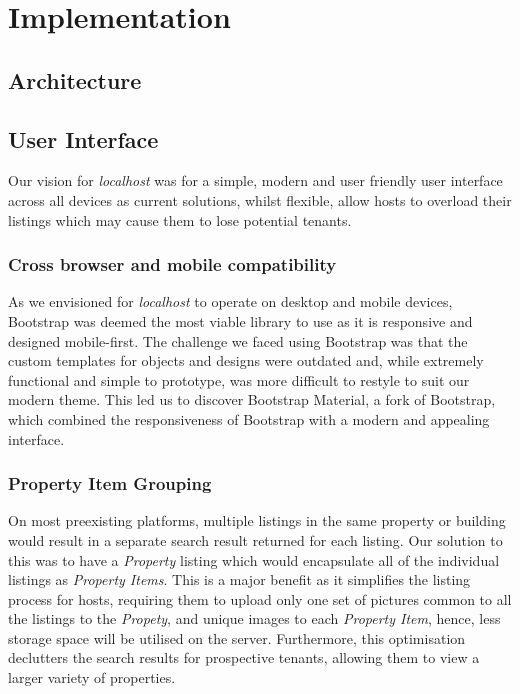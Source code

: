 \section{Implementation}
\subsection{Architecture}
\subsection{User Interface}

Our vision for \emph{localhost} was for a simple, modern and user friendly user
interface across all devices as current solutions, whilst flexible, allow hosts
to overload their listings which may cause them to lose potential tenants.

\subsubsection{Cross browser and mobile compatibility}

As we envisioned for \emph{localhost} to operate on desktop and mobile devices,
Bootstrap was deemed the most viable library to use as it is responsive and
designed mobile-first. The challenge we faced using Bootstrap was that the custom
templates for objects and designs were outdated and, while extremely functional
and simple to prototype, was more difficult to restyle to suit our modern theme.
This led us to discover Bootstrap Material, a fork of Bootstrap, which combined
the responsiveness of Bootstrap with a modern and appealing interface.

\subsubsection{Property Item Grouping}
On most preexisting platforms, multiple listings in the same property or building
would result in a separate search result returned for each listing. Our solution
to this was to have a \emph{Property} listing which would encapsulate all of the
individual listings as \emph{Property Items}. This is a major benefit as it 
simplifies the listing process for hosts, requiring them to upload only one set
of pictures common to all the listings to the \emph{Propety}, and unique images
to each \emph{Property Item}, hence, less storage space will be utilised on the 
server. Furthermore, this optimisation declutters the search results for 
prospective tenants, allowing them to view a larger variety of properties.

